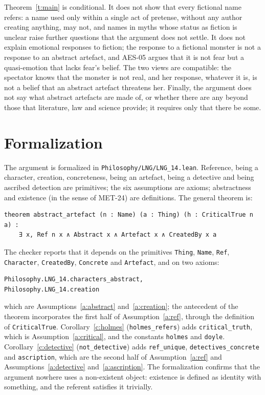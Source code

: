 \documentclass{situationist-preprint}
\begin{document}
Theorem~\ref{t:main} is conditional. It does not show that every fictional name refers: a name used only within a single act of pretense, without any author creating anything, may not, and names in myths whose status as fiction is unclear raise further questions that the argument does not settle. It does not explain emotional responses to fiction; the response to a fictional monster is not a response to an abstract artefact, and AES-05 argues that it is not fear but a quasi-emotion that lacks fear's belief. The two views are compatible: the spectator knows that the monster is not real, and her response, whatever it is, is not a belief that an abstract artefact threatens her. Finally, the argument does not say what abstract artefacts are made of, or whether there are any beyond those that literature, law and science provide; it requires only that there be some.

\section{Formalization}

The argument is formalized in \nolinkurl{Philosophy/LNG/LNG_14.lean}. Reference, being a character, creation, concreteness, being an artefact, being a detective and being ascribed detection are primitives; the six assumptions are axioms; abstractness and existence (in the sense of MET-24) are definitions. The general theorem is:

\begin{lstlisting}
theorem abstract_artefact (n : Name) (a : Thing) (h : CriticalTrue n a) :
    ∃ x, Ref n x ∧ Abstract x ∧ Artefact x ∧ CreatedBy x a
\end{lstlisting}

The checker reports that it depends on the primitives \lstinline{Thing}, \lstinline{Name}, \lstinline{Ref}, \lstinline{Character}, \lstinline{CreatedBy}, \lstinline{Concrete} and \lstinline{Artefact}, and on two axioms:

\begin{lstlisting}
Philosophy.LNG_14.characters_abstract,
Philosophy.LNG_14.creation
\end{lstlisting}

which are Assumptions~\ref{a:abstract} and~\ref{a:creation}; the antecedent of the theorem incorporates the first half of Assumption~\ref{a:ref}, through the definition of \lstinline{CriticalTrue}. Corollary~\ref{c:holmes} (\lstinline{holmes_refers}) adds \lstinline{critical_truth}, which is Assumption~\ref{a:critical}, and the constants \lstinline{holmes} and \lstinline{doyle}. Corollary~\ref{c:detective} (\lstinline{not_detective}) adds \lstinline{ref_unique}, \lstinline{detectives_concrete} and \lstinline{ascription}, which are the second half of Assumption~\ref{a:ref} and Assumptions~\ref{a:detective} and~\ref{a:ascription}. The formalization confirms that the argument nowhere uses a non-existent object: existence is defined as identity with something, and the referent satisfies it trivially.
\end{document}

